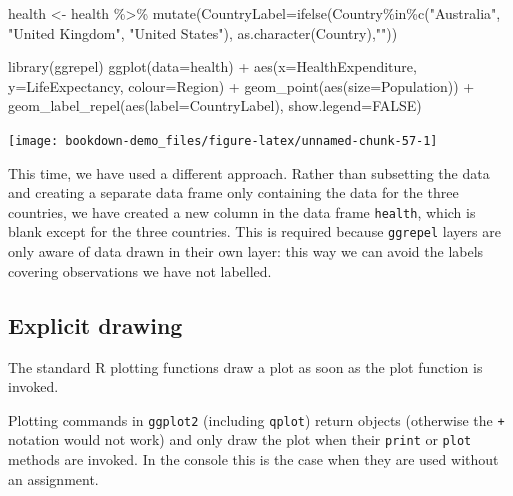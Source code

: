 \documentclass[
]{book}
\newenvironment{Shaded}{\begin{snugshade}}{\end{snugshade}}
\newcommand{\AttributeTok}[1]{\textcolor[rgb]{0.77,0.63,0.00}{#1}}
\newcommand{\ConstantTok}[1]{\textcolor[rgb]{0.00,0.00,0.00}{#1}}
\newcommand{\FunctionTok}[1]{\textcolor[rgb]{0.00,0.00,0.00}{#1}}
\newcommand{\NormalTok}[1]{#1}
\newcommand{\OtherTok}[1]{\textcolor[rgb]{0.56,0.35,0.01}{#1}}
\newcommand{\SpecialCharTok}[1]{\textcolor[rgb]{0.00,0.00,0.00}{#1}}
\newcommand{\StringTok}[1]{\textcolor[rgb]{0.31,0.60,0.02}{#1}}
\begin{document}
\begin{Shaded}
\begin{Highlighting}[]
\NormalTok{health }\OtherTok{\textless{}{-}}\NormalTok{ health }\SpecialCharTok{\%\textgreater{}\%}
    \FunctionTok{mutate}\NormalTok{(}\AttributeTok{CountryLabel=}\FunctionTok{ifelse}\NormalTok{(Country}\SpecialCharTok{\%in\%}\FunctionTok{c}\NormalTok{(}\StringTok{"Australia"}\NormalTok{, }\StringTok{"United Kingdom"}\NormalTok{, }\StringTok{"United States"}\NormalTok{),}
                               \FunctionTok{as.character}\NormalTok{(Country),}\StringTok{""}\NormalTok{))}

\FunctionTok{library}\NormalTok{(ggrepel)}
\FunctionTok{ggplot}\NormalTok{(}\AttributeTok{data=}\NormalTok{health) }\SpecialCharTok{+} 
    \FunctionTok{aes}\NormalTok{(}\AttributeTok{x=}\NormalTok{HealthExpenditure,  }\AttributeTok{y=}\NormalTok{LifeExpectancy, }\AttributeTok{colour=}\NormalTok{Region) }\SpecialCharTok{+}
    \FunctionTok{geom\_point}\NormalTok{(}\FunctionTok{aes}\NormalTok{(}\AttributeTok{size=}\NormalTok{Population)) }\SpecialCharTok{+}
    \FunctionTok{geom\_label\_repel}\NormalTok{(}\FunctionTok{aes}\NormalTok{(}\AttributeTok{label=}\NormalTok{CountryLabel), }\AttributeTok{show.legend=}\ConstantTok{FALSE}\NormalTok{)}
\end{Highlighting}
\end{Shaded}

\texttt{[image: bookdown-demo\_files/figure-latex/unnamed-chunk-57-1]}

This time, we have used a different approach. Rather than subsetting the data and creating a separate data frame only containing the data for the three countries, we have created a new column in the data frame \texttt{health}, which is blank except for the three countries. This is required because \texttt{ggrepel} layers are only aware of data drawn in their own layer: this way we can avoid the labels covering observations we have not labelled.

\hypertarget{explicit-drawing}{%
\subsection{Explicit drawing}\label{explicit-drawing}}

The standard R plotting functions draw a plot as soon as the plot function is invoked.

Plotting commands in \texttt{ggplot2} (including \texttt{qplot}) return objects (otherwise the \texttt{+} notation would not work) and only draw the plot when their \texttt{print} or \texttt{plot} methods are invoked. In the console this is the case when they are used without an assignment.
\end{document}
